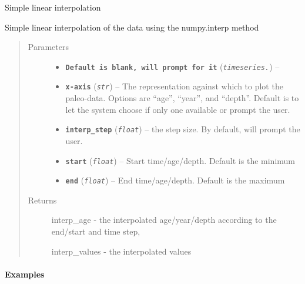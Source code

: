 \documentclass[letterpaper,10pt,english]{sphinxmanual}
\begin{document}

\begin{fulllineitems}
\label{Main:pyleoclim.interpTs}
Simple linear interpolation

Simple linear interpolation of the data using the numpy.interp method
\begin{quote}\begin{description}
\item[{Parameters}] \leavevmode\begin{itemize}
\item {} 
\textbf{\texttt{Default is blank, will prompt for it}} (\emph{\texttt{timeseries.}}) -- 

\item {} 
\textbf{\texttt{x-axis}} (\emph{\texttt{str}}) -- The representation against which to plot the paleo-data.
Options are ``age'', ``year'', and ``depth''. Default is to let the
system choose if only one available or prompt the user.

\item {} 
\textbf{\texttt{interp\_step}} (\emph{\texttt{float}}) -- the step size. By default, will prompt the user.

\item {} 
\textbf{\texttt{start}} (\emph{\texttt{float}}) -- Start time/age/depth. Default is the minimum

\item {} 
\textbf{\texttt{end}} (\emph{\texttt{float}}) -- End time/age/depth. Default is the maximum

\end{itemize}

\item[{Returns}] \leavevmode

interp\_age - the interpolated age/year/depth according to the end/start
and time step,

interp\_values - the interpolated values


\end{description}\end{quote}
\paragraph{Examples}


\end{fulllineitems}
\end{document}
